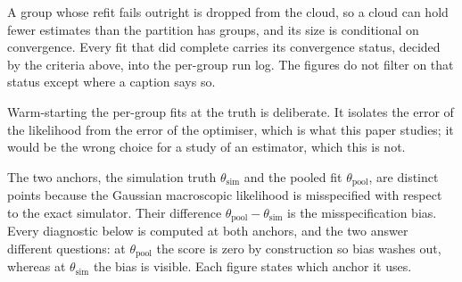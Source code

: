 A group whose refit fails outright is dropped from the cloud, so a cloud can hold
fewer estimates than the partition has groups, and its size is conditional on
convergence. Every fit that did complete carries its convergence status, decided by
the criteria above, into the per-group run log. The figures do not filter on that status except where a caption says so.

Warm-starting the per-group fits at the truth is deliberate. It isolates the error
of the likelihood from the error of the optimiser, which is what this paper studies;
it would be the wrong choice for a study of an estimator, which this is not.

The two anchors, the simulation truth $\theta_{\mathrm{sim}}$ and the pooled fit
$\theta_{\mathrm{pool}}$, are distinct points because the Gaussian macroscopic
likelihood is misspecified with respect to the exact simulator. Their difference
$\theta_{\mathrm{pool}} - \theta_{\mathrm{sim}}$ is the misspecification bias. Every
diagnostic below is computed at both anchors, and the two answer different
questions: at $\theta_{\mathrm{pool}}$ the score is zero by construction so bias
washes out, whereas at $\theta_{\mathrm{sim}}$ the bias is visible. Each figure states which anchor
it uses.

